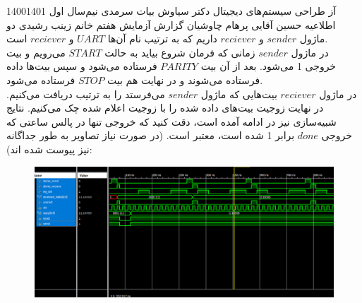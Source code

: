 \documentclass[a4paper,12pt]{article}
\begin{document}
\handout
{آز طراحی سیستم‌های دیجیتال}
{دکتر سیاوش بیات سرمدی}
{نیم‌سال اول 1400\lr{-}1401}
{اطلاعیه}
{ \newline حسین آقایی \newline پرهام چاوشیان}
{  }
 {گزارش آزمایش هفتم}
 {خانم زینب رشیدی}
دو ماژول
$sender$
و
$reciever$
داریم که به ترتیب نام آن‌ها
$UART$
و
$reciever$
است.\\
در ماژول $sender$ زمانی که فرمان شروع بیاید به حالت $START$ می‌رویم و بیت خروجی 1 می‌شود. بعد از آن بیت $PARITY$ فرستاده می‌شود و سپس بیت‌ها داده فرستاده می‌شوند و در نهایت هم بیت $STOP$ فرستاده می‌شود.\\
در ماژول $reciever$ بیت‌هایی که ماژول $sender$ می‌فرستد را به ترتیب دریافت می‌کنیم. در نهایت زوجیت بیت‌های داده شده را با زوجیت اعلام شده چک می‌کنیم.
نتایج شبیه‌سازی نیز در ادامه آمده است، دقت کنید که خروجی تنها در پالس ساعتی که خروجی $done$ برابر 1 شده است، معتبر است. (در صورت نیاز تصاویر به طور جداگانه نیز پیوست شده اند):
\begin{figure}[H]
 \centering
  \includegraphics[width=0.8\linewidth]{s1}
\end{figure}
\end{document}
